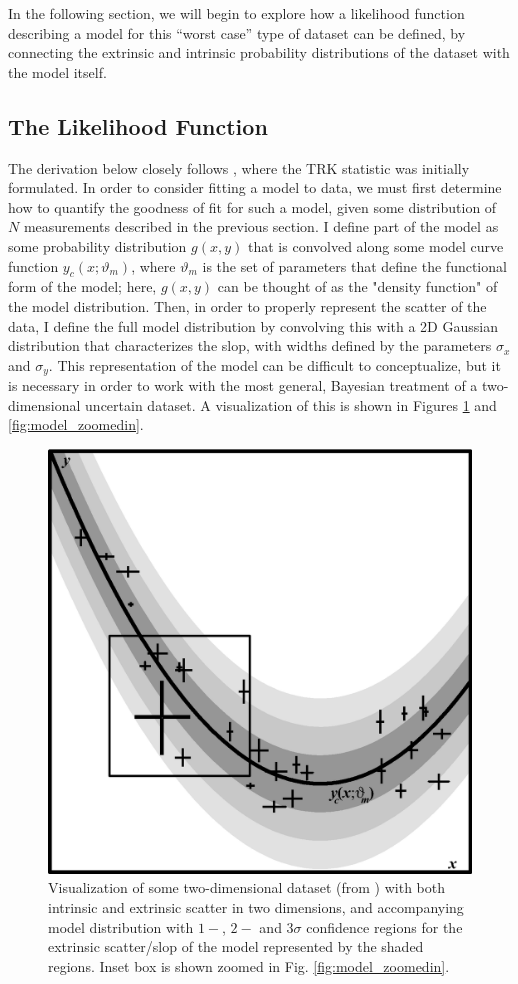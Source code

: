 In the following section, we will begin to explore how a likelihood function describing a model for this ``worst case'' type of dataset can be defined, by connecting the extrinsic and intrinsic probability distributions of the dataset with the model itself.

\subsection{The Likelihood Function}
The derivation below closely follows \textcite{trotter}, where the TRK statistic was initially formulated. In order to consider fitting a model to data, we must first determine how to quantify the goodness of fit for such a model, given some distribution of $N$ measurements described in the previous section. I define part of the model as some probability distribution $g(x,y)$ that is convolved along some model curve function $y_c(x;\vartheta_m)$, where $\vartheta_m$ is the set of parameters that define the functional form of the model; here, $g(x,y)$ can be thought of as the "density function" of the model distribution. Then, in order to properly represent the scatter of the data, I define the full model distribution by convolving this with a 2D Gaussian distribution that characterizes the slop, with widths defined by the parameters $\sigma_x$ and $\sigma_y$. This representation of the model can be difficult to conceptualize, but it is necessary in order to work with the most general, Bayesian treatment of a two-dimensional uncertain dataset. A visualization of this is shown in Figures \ref{fig:model} and \ref{fig:model_zoomedin}.

\begin{figure}
    \centering
    \includegraphics[width=0.8\linewidth]{figures/model.eps}
    \caption{Visualization of some two-dimensional dataset (from \textcite{trotter}) with both intrinsic and extrinsic scatter in two dimensions, and accompanying model distribution with $1-$, $2-$ and $3\sigma$ confidence regions for the extrinsic scatter/slop of the model represented by the shaded regions. Inset box is shown zoomed in Fig. \ref{fig:model_zoomedin}.}
    \label{fig:model}
\end{figure}

